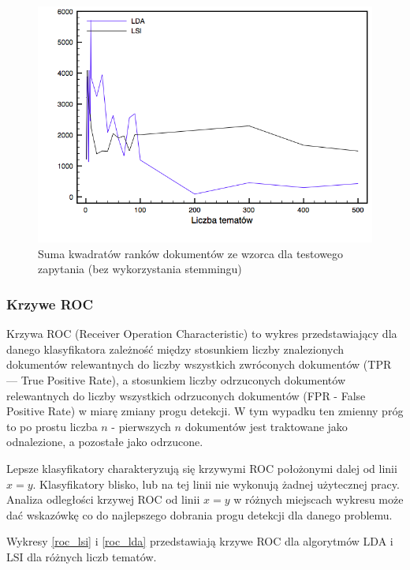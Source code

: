 \documentclass[11pt,a4paper]{article}
\begin{document}
\begin{figure}[h]
\caption{Suma kwadratów ranków dokumentów ze wzorca dla testowego zapytania (bez wykorzystania stemmingu)}
\label{ranks_no_stemming_comparison}
\includegraphics[width=\linewidth]{gfx/ranks_no_stemming.png}
\end{figure}

\FloatBarrier

\subsubsection{Krzywe ROC}

Krzywa ROC \cite{roc-article1} (Receiver Operation Characteristic) to wykres
przedstawiający dla danego klasyfikatora zależność między stosunkiem liczby
znalezionych dokumentów relewantnych do liczby wszystkich zwróconych dokumentów
(TPR --- True Positive Rate), a stosunkiem liczby odrzuconych dokumentów
relewantnych do liczby wszystkich odrzuconych dokumentów (FPR - False Positive
Rate) w miarę zmiany progu detekcji. W tym wypadku ten zmienny próg to po
prostu liczba $n$ - pierwszych $n$ dokumentów jest traktowane jako odnalezione,
a pozostałe jako odrzucone.

Lepsze klasyfikatory charakteryzują się krzywymi ROC położonymi dalej od linii
$x = y$.  Klasyfikatory blisko, lub na tej linii nie wykonują żadnej użytecznej
pracy. Analiza odległości krzywej ROC od linii $x = y$ w różnych miejscach
wykresu może dać wskazówkę co do najlepszego dobrania progu detekcji dla danego
problemu.

Wykresy \ref{roc_lsi} i \ref{roc_lda} przedstawiają krzywe ROC dla algorytmów
LDA i LSI dla różnych liczb tematów.
\end{document}
